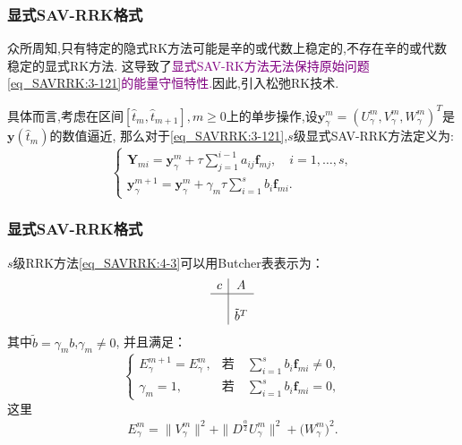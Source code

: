 \documentclass[aspectratio=169]{beamer}
\numberwithin{theorem}{section} %
\numberwithin{equation}{section}%
\numberwithin{figure}{section}%
\numberwithin{table}{section}%
\begin{document}
\begin{frame}\frametitle{显式SAV-RRK格式}
	众所周知,只有特定的隐式RK方法可能是辛的或代数上稳定的,不存在辛的或代数稳定的显式RK方法.
	这导致了\textcolor{purple}{显式SAV-RK方法无法保持原始问题\eqref{eq_SAVRRK:3-121}的能量守恒特性.}因此,引入松弛RK技术.

	具体而言,考虑在区间$\left[\hat{t}_m, \hat{t}_{m+1}\right], m \geq 0$上的单步操作,设$\bm{y}_\gamma^m=\left(U^{m}_{\gamma},V^{m}_{\gamma},W^{m}_{\gamma}\right)^T$是$\bm{y}\left(\hat{t}_m\right)$的数值逼近,
那么对于\eqref{eq_SAVRRK:3-121},$s$级显式SAV-RRK方法定义为:
{\color{purple}\begin{equation}
	\left\{\begin{array}{l}
	\bm{Y}_{m i}=\bm{y}_\gamma^m+\tau \sum\limits_{j=1}^{i-1} a_{i j} \bm{f}_{m j}, \quad i=1, \ldots, s, \\
	\bm{y}_\gamma^{m+1}=\bm{y}_\gamma^m+\gamma_m \tau \sum\limits_{i=1}^s b_i \bm{f}_{m i}.
	\end{array}\right.\label{eq_SAVRRK:4-3}
	\end{equation}}
\end{frame}

\begin{frame}\frametitle{显式SAV-RRK格式}
	$s$级RRK方法\eqref{eq_SAVRRK:4-3}可以用Butcher表表示为：
	\begin{equation}
	\begin{array}{c|c}
	c & A \\
	\hline \\
	& \tilde{b}^T
	\end{array}
	\end{equation}
	其中$\tilde{b}=\gamma_m b$,$\gamma_m\neq 0$, 并且满足：
	\begin{equation}
	\left\{\begin{array}{ll}
	E_{\gamma}^{m+1}=E_{\gamma}^{m}, & \text{若} \quad  \sum\limits_{i=1}^s b_i \bm{f}_{m i} \neq 0,\\
	\gamma_m=1, & \text{若} \quad  \sum\limits_{i=1}^s b_i \bm{f}_{m i} =0,
	\end{array}\right.\label{eq_SAVRRK:4-6}
	\end{equation}
	这里
	\begin{align}\label{eq_SAVRRK:4-6b}
	E_{\gamma}^{m}  =\|V_{\gamma}^{m}\|^2+\|D^\frac{\alpha}{2} U_{\gamma}^{m}\|^2+\big(W_{\gamma}^{m}\big)^2.
	\end{align}
	
\end{frame}
\end{document}
